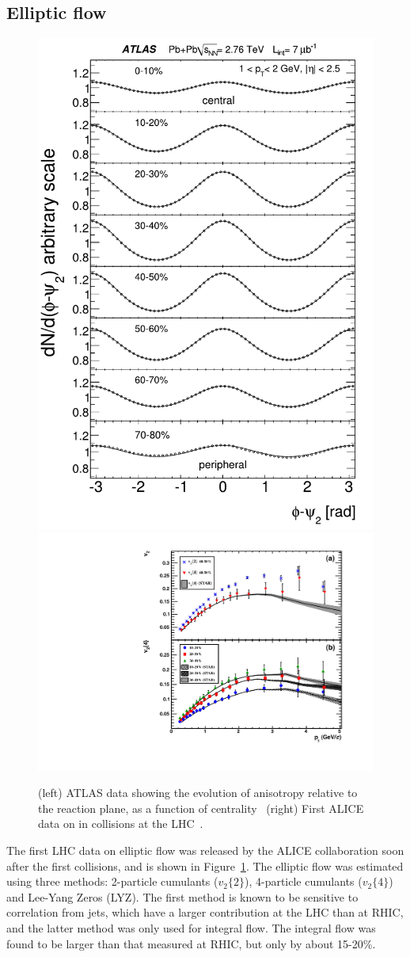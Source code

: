 \subsection{Elliptic flow}
\begin{figure}[!tb]
\begin{center}
\includegraphics[height=0.49\textwidth]{flowcorrelations_figs/atlas_v2_fig_02.pdf}
\includegraphics[height=0.49\textwidth]{flowcorrelations_figs/fig2.pdf}
\caption[]{(left) ATLAS data showing the evolution of anisotropy relative to the reaction plane, as a function of centrality~\cite{ATLAS:2011ah} (right) First ALICE data on \vtwo in \PbPb collisions at the LHC~\cite{Aamodt:2010pa}.}
\label{fig:pas:fc:firstresults}
\end{center}
\end{figure}
The first LHC data on elliptic flow was released by the ALICE collaboration soon after the first collisions,
and is shown in Figure~\ref{fig:pas:fc:firstresults}.
The elliptic flow was estimated using three methods: 2-particle cumulants ($v_2\{2\}$), 4-particle cumulants ($v_2\{4\}$)
and Lee-Yang Zeros (LYZ).  The first method is known to be sensitive to correlation from jets, which have
a larger contribution at the LHC than at RHIC, and the latter method was only used for integral flow.
The integral flow was found to be larger than that measured at RHIC, but only by about 15-20\%.
